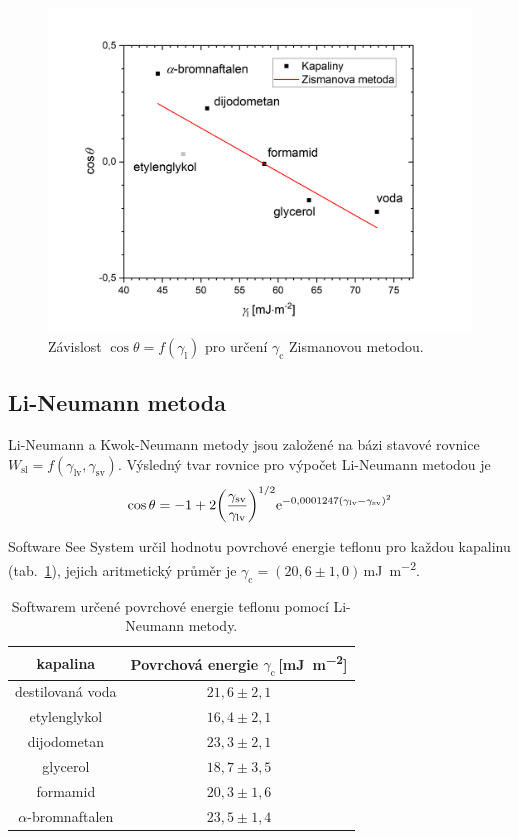 \documentclass{protokol}
\begin{document}
\begin{figure}[h!]
	\centering
	\includegraphics[width=130mm]{zisman.png}
	\caption{Závislost $\cos\theta = 
		f\left(\gamma_{\text{l}} \right)$ pro určení $\gamma_{\text{c}}$ 
		Zismanovou metodou.}
	\label{graph:zisman}
\end{figure}

\subsection{Li-Neumann metoda}
\par Li-Neumann a Kwok-Neumann metody jsou založené na bázi stavové rovnice 
$W_\text{sl}=f(\gamma_{\text{lv}},\gamma_{\text{sv}})$. Výsledný tvar rovnice 
pro výpočet Li-Neumann metodou je
\begin{equation}
	\cos\theta = -1 + 
	2 {\left( \frac{\gamma_{\text{sv}}} {\gamma_{\text{lv}}} \right)}^{1/2} 
	\mathrm{e}^{-0,0001247(\gamma_{\text{lv}} - \gamma_{\text{sv}})^2}
\end{equation}

Software See System určil hodnotu povrchové energie teflonu pro každou 
kapalinu (tab.~\ref{table:LiNeumann}), jejich aritmetický průměr je 
$\gamma_{\text{c}} = (20,6\pm1,0)$\,\si{\milli\joule\per\meter\squared}.

\begin{table}[h]
	\caption{Softwarem určené povrchové energie teflonu pomocí Li-Neumann 
	metody.}
	\label{table:LiNeumann}
	\begin{tabular}{|c|c|}\hline
		kapalina  & Povrchová energie 
		$\gamma_{\text{c}}$\,[\si{\milli\joule\per\meter\squared}] \\ \hline
		destilovaná voda & $21,6 \pm 2,1$     \\
		etylenglykol     & $16,4 \pm 2,1$     \\
		dijodometan      & $23,3 \pm 2,1$     \\
		glycerol         & $18,7 \pm 3,5$     \\
		formamid         & $20,3 \pm 1,6$     \\
		$\alpha$-bromnaftalen & $23,5 \pm 1,4$\\ \hline
	\end{tabular}
\end{table}
\end{document}
